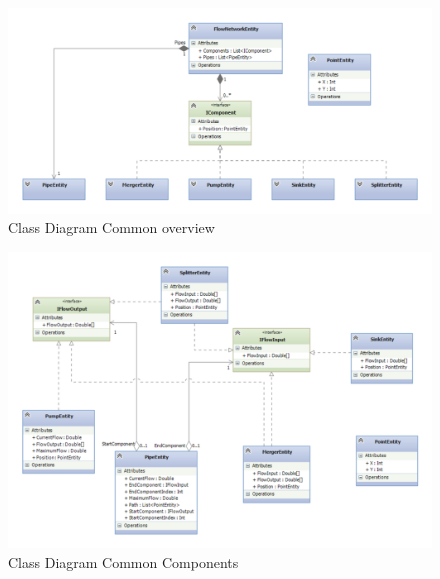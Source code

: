 \begin{figure}
	\centering
	\includegraphics[width=\textwidth]{figures/ClassCommonOverall.pdf}
	\caption{Class Diagram Common overview}
	\label{fig:commonoverview}
\end{figure}

\begin{figure}
	\centering
	\includegraphics[width=\textwidth]{figures/ClassCommonComponents.pdf}
	\caption{Class Diagram Common Components}
	\label{fig:classcomponents}
\end{figure}